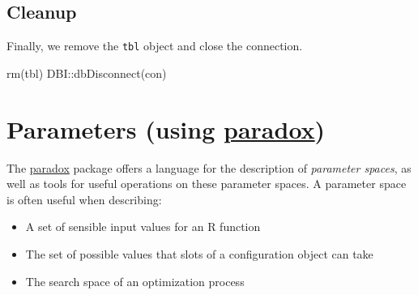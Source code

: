 \documentclass[
  11pt,
  parskip=half,
  DIV=calc,
  BCOR=10mm,
  x11names]{scrbook}
\newenvironment{Shaded}{}{}
\newcommand{\KeywordTok}[1]{\textcolor[rgb]{0.00,0.00,1.00}{#1}}
\newcommand{\NormalTok}[1]{#1}
\newcommand{\OperatorTok}[1]{#1}
\newcommand{\StringTok}[1]{\textcolor[rgb]{0.00,0.50,0.50}{#1}}
\providecommand{\tightlist}{%
  \setlength{\itemsep}{0pt}\setlength{\parskip}{0pt}}
\begin{document}
\begin{Shaded}
\end{Shaded}

\hypertarget{cleanup}{%
\subsection{Cleanup}\label{cleanup}}

Finally, we remove the \texttt{tbl} object and close the connection.

\begin{Shaded}
\begin{Highlighting}[]
\KeywordTok{rm}\NormalTok{(tbl)}
\NormalTok{DBI}\OperatorTok{::}\KeywordTok{dbDisconnect}\NormalTok{(con)}
\end{Highlighting}
\end{Shaded}

\hypertarget{paradox}{%
\section{\texorpdfstring{Parameters (using \href{https://paradox.mlr-org.com}{paradox})}{Parameters (using paradox)}}\label{paradox}}

The \href{https://paradox.mlr-org.com}{paradox} package offers a language for the description of \emph{parameter spaces}, as well as tools for useful operations on these parameter spaces.
A parameter space is often useful when describing:

\begin{itemize}
\tightlist
\item
  A set of sensible input values for an R function
\item
  The set of possible values that slots of a configuration object can take
\item
  The search space of an optimization process
\end{itemize}
\end{document}
